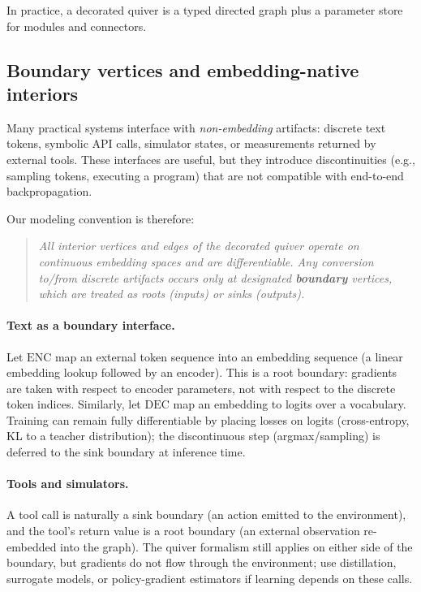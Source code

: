 \documentclass[11pt]{article}
\theoremstyle{definition}
\theoremstyle{plain}
\theoremstyle{remark}
\begin{document}
In practice, a decorated quiver is a typed directed graph plus a parameter store for modules and connectors.


\subsection{Boundary vertices and embedding-native interiors}
\label{sec:boundary}

Many practical systems interface with \emph{non-embedding} artifacts: discrete text tokens, symbolic API calls, simulator states, or measurements returned by external tools.
These interfaces are useful, but they introduce discontinuities (e.g., sampling tokens, executing a program) that are not compatible with end-to-end backpropagation.

Our modeling convention is therefore:

\begin{quote}
\emph{All interior vertices and edges of the decorated quiver operate on continuous embedding spaces and are differentiable.
Any conversion to/from discrete artifacts occurs only at designated \textbf{boundary} vertices, which are treated as roots (inputs) or sinks (outputs).}
\end{quote}

\paragraph{Text as a boundary interface.}
Let $\mathrm{ENC}$ map an external token sequence into an embedding sequence (a linear embedding lookup followed by an encoder).
This is a root boundary: gradients are taken with respect to encoder parameters, not with respect to the discrete token indices.
Similarly, let $\mathrm{DEC}$ map an embedding to logits over a vocabulary.
Training can remain fully differentiable by placing losses on logits (cross-entropy, KL to a teacher distribution); the discontinuous step (argmax/sampling) is deferred to the sink boundary at inference time.

\paragraph{Tools and simulators.}
A tool call is naturally a sink boundary (an action emitted to the environment), and the tool's return value is a root boundary (an external observation re-embedded into the graph).
The quiver formalism still applies on either side of the boundary, but gradients do not flow through the environment; use distillation, surrogate models, or policy-gradient estimators if learning depends on these calls.
\end{document}
